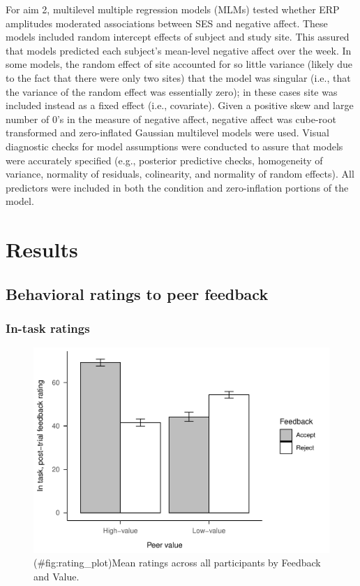 \documentclass[
  man]{apa7}
\begin{document}
For aim 2, multilevel multiple regression models (MLMs) tested whether ERP amplitudes moderated associations between SES and negative affect. These models included random intercept effects of subject and study site. This assured that models predicted each subject's mean-level negative affect over the week. In some models, the random effect of site accounted for so little variance (likely due to the fact that there were only two sites) that the model was singular (i.e., that the variance of the random effect was essentially zero); in these cases site was included instead as a fixed effect (i.e., covariate). Given a positive skew and large number of 0's in the measure of negative affect, negative affect was cube-root transformed and zero-inflated Gaussian multilevel models were used. Visual diagnostic checks for model assumptions were conducted to assure that models were accurately specified (e.g., posterior predictive checks, homogeneity of variance, normality of residuals, colinearity, and normality of random effects). All predictors were included in both the condition and zero-inflation portions of the model.

\hypertarget{results}{%
\section{Results}\label{results}}

\hypertarget{behavioral-ratings-to-peer-feedback}{%
\subsection{Behavioral ratings to peer feedback}\label{behavioral-ratings-to-peer-feedback}}

\hypertarget{in-task-ratings}{%
\subsubsection{In-task ratings}\label{in-task-ratings}}

\begin{figure}
\centering
\includegraphics{BUDS_manuscript_working_files/figure-latex/rating_plot-1.pdf}
\caption{(\#fig:rating\_plot)Mean ratings across all participants by Feedback and Value.}
\end{figure}
\end{document}
